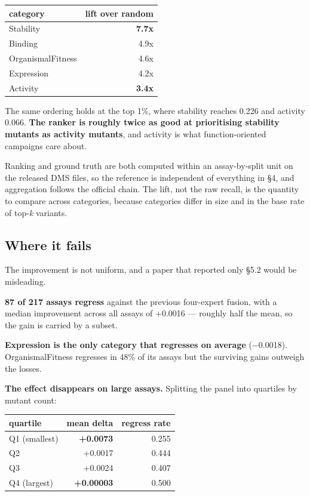 \documentclass[sigconf,review,nonacm]{acmart}
\begin{document}
\begin{table}[t]
\centering
\small
\begin{tabular}{lr}
\hline
category & lift over random \\
\hline
Stability & \textbf{7.7x} \\
Binding & 4.9x \\
OrganismalFitness & 4.6x \\
Expression & 4.2x \\
Activity & \textbf{3.4x} \\
\hline
\end{tabular}
\end{table}

The same ordering holds at the top 1\%, where stability reaches 0.226 and activity 0.066. \textbf{The ranker is
roughly twice as good at prioritising stability mutants as activity mutants}, and activity is what
function-oriented campaigns care about.

Ranking and ground truth are both computed within an assay-by-split unit on the released DMS files, so
the reference is independent of everything in §4, and aggregation follows the official chain. The lift,
not the raw recall, is the quantity to compare across categories, because categories differ in size and
in the base rate of top-\emph{k} variants.

\subsection{Where it fails}\label{where-it-fails}

The improvement is not uniform, and a paper that reported only §5.2 would be misleading.

\textbf{87 of 217 assays regress} against the previous four-expert fusion, with a median improvement across
all assays of +0.0016 --- roughly half the mean, so the gain is carried by a subset.

\textbf{Expression is the only category that regresses on average} (−0.0018). OrganismalFitness regresses in
48\% of its assays but the surviving gains outweigh the losses.

\textbf{The effect disappears on large assays.} Splitting the panel into quartiles by mutant count:

\begin{table}[t]
\centering
\small
\begin{tabular}{lrr}
\hline
quartile & mean delta & regress rate \\
\hline
Q1 (smallest) & \textbf{+0.0073} & 0.255 \\
Q2 & +0.0017 & 0.444 \\
Q3 & +0.0024 & 0.407 \\
Q4 (largest) & \textbf{+0.00003} & 0.500 \\
\hline
\end{tabular}
\end{table}
\end{document}
